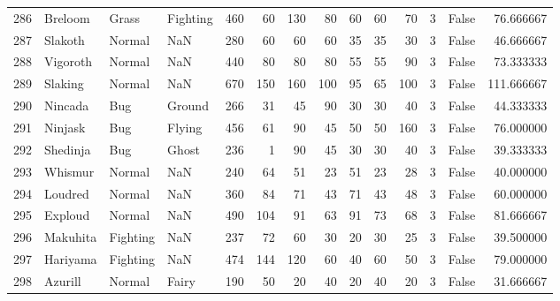 \begin{tabular}{rlllrrrrrrrrlr}
 286 &                    Breloom &     Grass &  Fighting &    460 &   60 &     130 &       80 &       60 &       60 &     70 &           3 &      False &   76.666667 \\
 287 &                    Slakoth &    Normal &       NaN &    280 &   60 &      60 &       60 &       35 &       35 &     30 &           3 &      False &   46.666667 \\
 288 &                   Vigoroth &    Normal &       NaN &    440 &   80 &      80 &       80 &       55 &       55 &     90 &           3 &      False &   73.333333 \\
 289 &                    Slaking &    Normal &       NaN &    670 &  150 &     160 &      100 &       95 &       65 &    100 &           3 &      False &  111.666667 \\
 290 &                    Nincada &       Bug &    Ground &    266 &   31 &      45 &       90 &       30 &       30 &     40 &           3 &      False &   44.333333 \\
 291 &                    Ninjask &       Bug &    Flying &    456 &   61 &      90 &       45 &       50 &       50 &    160 &           3 &      False &   76.000000 \\
 292 &                   Shedinja &       Bug &     Ghost &    236 &    1 &      90 &       45 &       30 &       30 &     40 &           3 &      False &   39.333333 \\
 293 &                    Whismur &    Normal &       NaN &    240 &   64 &      51 &       23 &       51 &       23 &     28 &           3 &      False &   40.000000 \\
 294 &                    Loudred &    Normal &       NaN &    360 &   84 &      71 &       43 &       71 &       43 &     48 &           3 &      False &   60.000000 \\
 295 &                    Exploud &    Normal &       NaN &    490 &  104 &      91 &       63 &       91 &       73 &     68 &           3 &      False &   81.666667 \\
 296 &                   Makuhita &  Fighting &       NaN &    237 &   72 &      60 &       30 &       20 &       30 &     25 &           3 &      False &   39.500000 \\
 297 &                   Hariyama &  Fighting &       NaN &    474 &  144 &     120 &       60 &       40 &       60 &     50 &           3 &      False &   79.000000 \\
 298 &                    Azurill &    Normal &     Fairy &    190 &   50 &      20 &       40 &       20 &       40 &     20 &           3 &      False &   31.666667 \\

\end{tabular}
